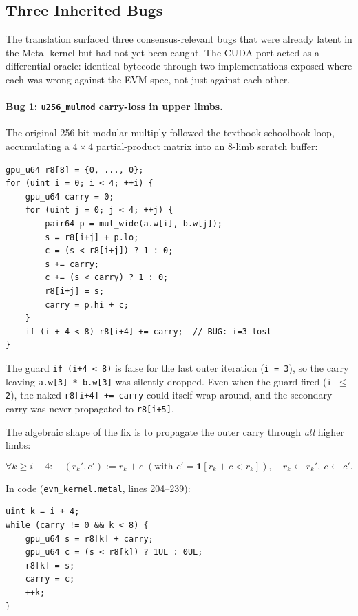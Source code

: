 \subsection{Three Inherited Bugs}

The translation surfaced three consensus-relevant bugs that were already
latent in the Metal kernel but had not yet been caught. The CUDA port
acted as a differential oracle: identical bytecode through two
implementations exposed where each was wrong against the EVM spec, not
just against each other.

\paragraph{Bug 1: \texttt{u256\_mulmod} carry-loss in upper limbs.}

The original 256-bit modular-multiply followed the textbook
schoolbook loop, accumulating a $4 \times 4$ partial-product matrix into
an 8-limb scratch buffer:

\begin{verbatim}
gpu_u64 r8[8] = {0, ..., 0};
for (uint i = 0; i < 4; ++i) {
    gpu_u64 carry = 0;
    for (uint j = 0; j < 4; ++j) {
        pair64 p = mul_wide(a.w[i], b.w[j]);
        s = r8[i+j] + p.lo;
        c = (s < r8[i+j]) ? 1 : 0;
        s += carry;
        c += (s < carry) ? 1 : 0;
        r8[i+j] = s;
        carry = p.hi + c;
    }
    if (i + 4 < 8) r8[i+4] += carry;  // BUG: i=3 lost
}
\end{verbatim}

The guard \texttt{if (i+4 < 8)} is false for the last outer iteration
(\texttt{i = 3}), so the carry leaving \texttt{a.w[3] * b.w[3]} was
silently dropped. Even when the guard fired (\texttt{i $\le$ 2}), the
naked \texttt{r8[i+4] += carry} could itself wrap around, and the
secondary carry was never propagated to \texttt{r8[i+5]}.

The algebraic shape of the fix is to propagate the outer carry through
\emph{all} higher limbs:

\[
\forall k \ge i+4 :\quad
(r_k', c') := r_k + c \;(\text{with } c' = \mathbf{1}[r_k + c < r_k]),
\quad r_k \gets r_k',\ c \gets c'.
\]

In code (\texttt{evm\_kernel.metal}, lines 204--239):

\begin{verbatim}
uint k = i + 4;
while (carry != 0 && k < 8) {
    gpu_u64 s = r8[k] + carry;
    gpu_u64 c = (s < r8[k]) ? 1UL : 0UL;
    r8[k] = s;
    carry = c;
    ++k;
}
\end{verbatim}

